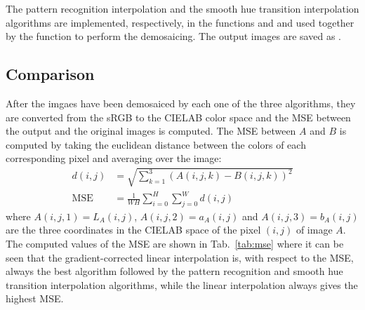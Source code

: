 \documentclass[a4paper,oneside]{article}
\begin{document}
The pattern recognition interpolation and the smooth hue transition
interpolation algorithms are implemented, respectively, in the
functions  and  and
used together by the function  to
perform the demosaicing. The output images are saved as
.

\subsection{Comparison}
After the imgaes have been demosaiced by each one of the three
algorithms, they are converted from the sRGB to the CIELAB color space
and the MSE between the output and the original images is
computed. The MSE between $A$ and $B$ is computed by taking the
euclidean distance between the colors of each corresponding pixel and
averaging over the image:
\begin{align*}
  d(i,j) &= \sqrt{\sum_{k=1}^3 \left(A(i,j,k) - B(i,j,k)\right)^2 } \\
  \text{MSE} &= \frac{1}{WH}\sum_{i=0}^H\sum_{j=0}^Wd(i,j)
\end{align*}
where $A(i,j,1) = L_A(i,j)$, $A(i,j,2) = a_A(i,j)$ and $A(i,j,3) =
b_A(i,j)$ are the three coordinates in the CIELAB space of the pixel
$(i,j)$ of image $A$.
%
The computed values of the MSE are shown in Tab.~\ref{tab:mse} where
it can be seen that the gradient-corrected linear interpolation is,
with respect to the MSE, always the best algorithm followed by the
pattern recognition and smooth hue transition interpolation
algorithms, while the linear interpolation always gives the highest
MSE.
\end{document}
